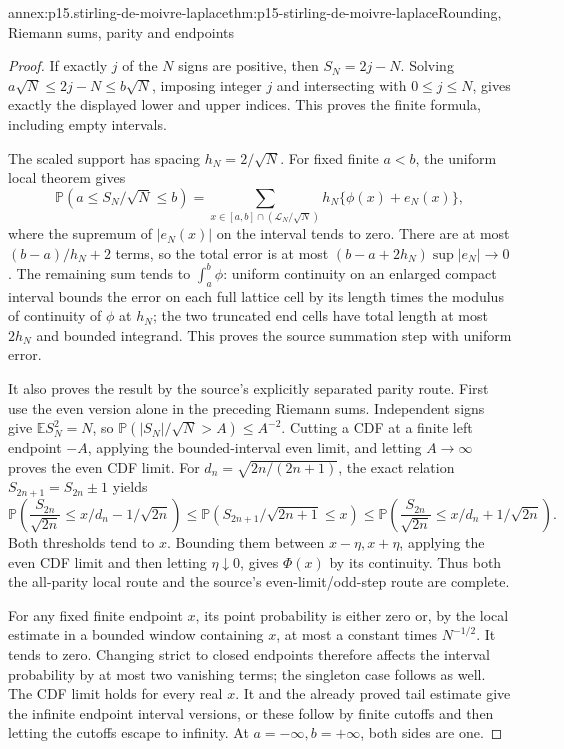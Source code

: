 \begin{annexitem}{annex:p15.stirling-de-moivre-laplace}{thm:p15-stirling-de-moivre-laplace}{Rounding, Riemann sums, parity and endpoints}
\begin{proof}
If exactly \(j\) of the \(N\) signs are positive, then
\(S_N=2j-N\). Solving
\(a\sqrt N\leq2j-N\leq b\sqrt N\), imposing integer \(j\)
and intersecting with \(0\leq j\leq N\), gives exactly
the displayed lower and upper indices. This proves the
finite formula, including empty intervals.

The scaled support has spacing \(h_N=2/\sqrt N\).
For fixed finite \(a<b\), the uniform local theorem gives
\[
 \mathbb P(a\leq S_N/\sqrt N\leq b)
   =\sum_{x\in[a,b]\cap(\mathcal L_N/\sqrt N)}
                          h_N\{\phi(x)+e_N(x)\},
\]
where the supremum of \(|e_N(x)|\) on the interval tends
to zero. There are at most \((b-a)/h_N+2\) terms, so the
total error is at most
\((b-a+2h_N)\sup|e_N|\to0\).
The remaining sum tends to \(\int_a^b\phi\):
uniform continuity on an enlarged compact interval bounds
the error on each full lattice cell by its length times
the modulus of continuity of \(\phi\) at \(h_N\);
the two truncated end cells have total length at most
\(2h_N\) and bounded integrand.
This proves the source summation step with uniform error.

It also proves the result by the source's explicitly
separated parity route. First use the even version alone
in the preceding Riemann sums. Independent signs give
\(\mathbb E S_N^2=N\), so
\(\mathbb P(|S_N|/\sqrt N>A)\leq A^{-2}\).
Cutting a CDF at a finite left endpoint \(-A\), applying
the bounded-interval even limit, and letting \(A\to\infty\)
proves the even CDF limit.
For \(d_n=\sqrt{2n/(2n+1)}\), the exact relation
\(S_{2n+1}=S_{2n}\pm1\) yields
\[
 \mathbb P\!\left(\frac{S_{2n}}{\sqrt{2n}}
                \leq x/d_n-1/\sqrt{2n}\right)
 \leq\mathbb P(S_{2n+1}/\sqrt{2n+1}\leq x)
 \leq
 \mathbb P\!\left(\frac{S_{2n}}{\sqrt{2n}}
                \leq x/d_n+1/\sqrt{2n}\right).
\]
Both thresholds tend to \(x\). Bounding them between
\(x-\eta,x+\eta\), applying the even CDF limit and then
letting \(\eta\downarrow0\), gives \(\Phi(x)\) by its
continuity. Thus both the all-parity local route and the
source's even-limit/odd-step route are complete.

For any fixed finite endpoint \(x\), its point probability
is either zero or, by the local estimate in a bounded
window containing \(x\), at most a constant times
\(N^{-1/2}\). It tends to zero. Changing strict to closed
endpoints therefore affects the interval probability by
at most two vanishing terms; the singleton case follows
as well. The CDF limit holds for every real \(x\).
It and the already proved tail estimate give the infinite
endpoint interval versions, or these follow by finite
cutoffs and then letting the cutoffs escape to infinity.
At \(a=-\infty,b=+\infty\), both sides are one.
\end{proof}
\end{annexitem}

